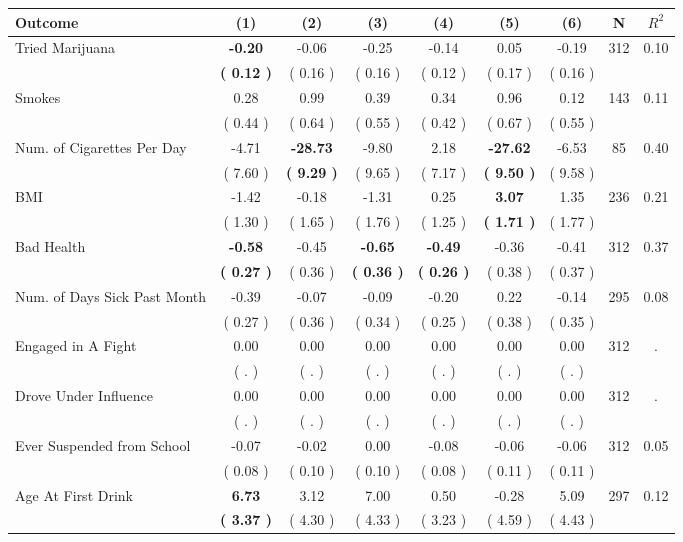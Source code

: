\begin{tabular}{lcccccccc}
\toprule
 \textbf{Outcome} & \textbf{(1)} & \textbf{(2)} & \textbf{(3)} & \textbf{(4)} & \textbf{(5)} & \textbf{(6)} & \textbf{N} & \textbf{$ R^2$} \\
\midrule
Tried Marijuana & \textbf{    -0.20} &     -0.06 &     -0.25 &     -0.14 &      0.05 &     -0.19 & 312 &       0.10 \\ 
 & \textbf{(     0.12 )} & (     0.16 ) & (     0.16 ) & (     0.12 ) & (     0.17 ) & (     0.16 ) & \\
Smokes &      0.28 &      0.99 &      0.39 &      0.34 &      0.96 &      0.12 & 143 &       0.11 \\ 
 & (     0.44 ) & (     0.64 ) & (     0.55 ) & (     0.42 ) & (     0.67 ) & (     0.55 ) & \\
Num. of Cigarettes Per Day &     -4.71 & \textbf{   -28.73} &     -9.80 &      2.18 & \textbf{   -27.62} &     -6.53 & 85 &       0.40 \\ 
 & (     7.60 ) & \textbf{(     9.29 )} & (     9.65 ) & (     7.17 ) & \textbf{(     9.50 )} & (     9.58 ) & \\
BMI &     -1.42 &     -0.18 &     -1.31 &      0.25 & \textbf{     3.07} &      1.35 & 236 &       0.21 \\ 
 & (     1.30 ) & (     1.65 ) & (     1.76 ) & (     1.25 ) & \textbf{(     1.71 )} & (     1.77 ) & \\
Bad Health & \textbf{    -0.58} &     -0.45 & \textbf{    -0.65} & \textbf{    -0.49} &     -0.36 &     -0.41 & 312 &       0.37 \\ 
 & \textbf{(     0.27 )} & (     0.36 ) & \textbf{(     0.36 )} & \textbf{(     0.26 )} & (     0.38 ) & (     0.37 ) & \\
Num. of Days Sick Past Month &     -0.39 &     -0.07 &     -0.09 &     -0.20 &      0.22 &     -0.14 & 295 &       0.08 \\ 
 & (     0.27 ) & (     0.36 ) & (     0.34 ) & (     0.25 ) & (     0.38 ) & (     0.35 ) & \\
Engaged in A Fight &      0.00 &      0.00 &      0.00 &      0.00 &      0.00 &      0.00 & 312 &          . \\ 
 & (        . ) & (        . ) & (        . ) & (        . ) & (        . ) & (        . ) & \\
Drove Under Influence &      0.00 &      0.00 &      0.00 &      0.00 &      0.00 &      0.00 & 312 &          . \\ 
 & (        . ) & (        . ) & (        . ) & (        . ) & (        . ) & (        . ) & \\
Ever Suspended from School &     -0.07 &     -0.02 &      0.00 &     -0.08 &     -0.06 &     -0.06 & 312 &       0.05 \\ 
 & (     0.08 ) & (     0.10 ) & (     0.10 ) & (     0.08 ) & (     0.11 ) & (     0.11 ) & \\
Age At First Drink & \textbf{     6.73} &      3.12 &      7.00 &      0.50 &     -0.28 &      5.09 & 297 &       0.12 \\ 
 & \textbf{(     3.37 )} & (     4.30 ) & (     4.33 ) & (     3.23 ) & (     4.59 ) & (     4.43 ) & \\
\bottomrule
\end{tabular}
